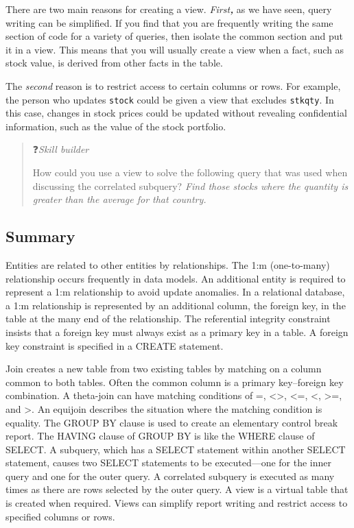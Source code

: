 \documentclass[
]{article}
\begin{document}
There are two main reasons for creating a view. \emph{First\textbf{,}} as we have
seen, query writing can be simplified. If you find that you are
frequently writing the same section of code for a variety of queries,
then isolate the common section and put it in a view. This means that
you will usually create a view when a fact, such as stock value, is
derived from other facts in the table.

The \emph{second} reason is to restrict access to certain columns or rows.
For example, the person who updates \texttt{stock} could be given a view that
excludes \texttt{stkqty}. In this case, changes in stock prices could be
updated without revealing confidential information, such as the value of
the stock portfolio.

\begin{quote}
❓\emph{Skill builder}

How could you use a view to solve the following query that was used
when discussing the correlated subquery? \textbar{} \emph{Find those stocks where
the quantity is greater than the average for that country.}
\end{quote}

\hypertarget{summary-3}{%
\subsection*{Summary}\label{summary-3}}

Entities are related to other entities by relationships. The 1:m
(one-to-many) relationship occurs frequently in data models. An
additional entity is required to represent a 1:m relationship to avoid
update anomalies. In a relational database, a 1:m relationship is
represented by an additional column, the foreign key, in the table at
the many end of the relationship. The referential integrity constraint
insists that a foreign key must always exist as a primary key in a
table. A foreign key constraint is specified in a CREATE statement.

Join creates a new table from two existing tables by matching on a
column common to both tables. Often the common column is a primary
key--foreign key combination. A theta-join can have matching conditions
of =, \textless\textgreater, \textless=, \textless, \textgreater=, and \textgreater. An equijoin describes the situation
where the matching condition is equality. The GROUP BY clause is used to
create an elementary control break report. The HAVING clause of GROUP BY
is like the WHERE clause of SELECT. A subquery, which has a SELECT
statement within another SELECT statement, causes two SELECT statements
to be executed---one for the inner query and one for the outer query. A
correlated subquery is executed as many times as there are rows selected
by the outer query. A view is a virtual table that is created when
required. Views can simplify report writing and restrict access to
specified columns or rows.
\end{document}
